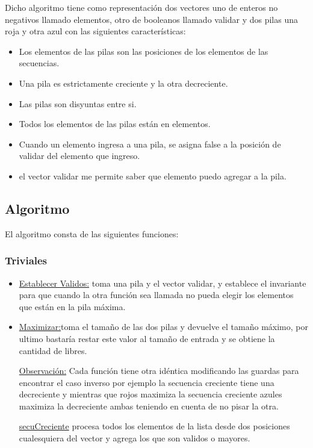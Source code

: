 Dicho  algoritmo tiene como representación dos vectores uno de enteros no negativos llamado elementos, otro de booleanos llamado validar y dos pilas una roja y otra azul con las siguientes características:
\begin{itemize}
    \item Los elementos de las pilas son las posiciones de los elementos de las secuencias.
    \item Una pila es estrictamente creciente y la otra decreciente.
    \item Las pilas son disyuntas entre si.
    \item Todos los elementos de las pilas están en elementos.
    \item Cuando un elemento ingresa a una pila, se asigna false a la posición de validar del elemento que ingreso.
    \item el vector validar me permite saber que elemento puedo agregar a la pila.
\end{itemize}

\subsection{Algoritmo}


El algoritmo consta de las siguientes funciones:
\subsubsection{Triviales}
\begin{itemize}

\item \underline{Establecer Validos:} \newline
 toma una pila y el vector validar, y establece el invariante para que cuando la otra función sea llamada no pueda
elegir los elementos que están en la pila máxima.
\item \underline{Maximizar:}\newline toma el tamaño de las dos pilas y devuelve el tamaño máximo,  por ultimo bastaría restar este valor al tamaño de entrada y se obtiene
la cantidad de libres.

\underline{Observación:} Cada función tiene otra idéntica modificando las guardas para encontrar el caso inverso por ejemplo la secuencia creciente tiene una decreciente
y mientras que rojos maximiza la secuencia creciente azules maximiza la decreciente ambas teniendo en cuenta de no pisar la otra.

\underline{secuCreciente} procesa todos los elementos de la lista desde dos posiciones cualesquiera del vector y agrega los que son validos o mayores.
\end{itemize}

